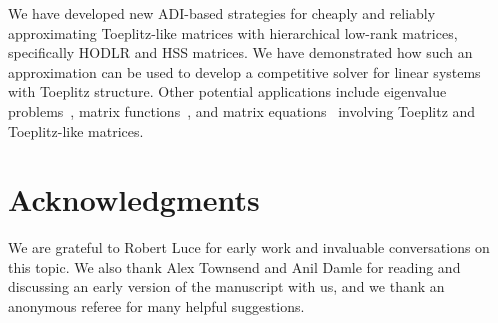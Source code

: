 \documentclass[final,reqno,onefignum,onetabnum]{siamart190516}
\begin{document}
 We have developed new ADI-based strategies for cheaply and reliably approximating Toeplitz-like matrices with hierarchical low-rank matrices, specifically HODLR and HSS matrices. We have demonstrated how such an approximation can be used to develop a competitive solver for linear systems with Toeplitz structure. Other potential applications include
 eigenvalue problems~\cite{Ou2022}, matrix functions~\cite{Casulli2024}, and matrix equations~\cite{KMR2019} involving Toeplitz and Toeplitz-like matrices.
 
 
 
\section*{Acknowledgments}

We are grateful to Robert Luce for early work and invaluable conversations on this topic. We also thank Alex Townsend and Anil Damle for reading and discussing an early version of the manuscript with us, and we thank an anonymous referee for many helpful suggestions.



\end{document}
